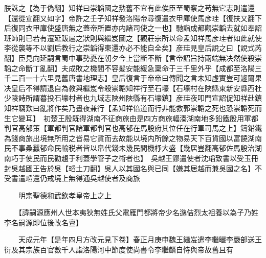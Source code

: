朕誅之【為于偽翻】知祥曰崇韜國之勲舊不宜有此俟臣至蜀察之苟無它志則遣還【還從宣翻又如字】帝許之壬子知祥發洛陽帝尋復遣衣甲庫使馬彦珪【復扶又翻下后復同衣甲庫使盛唐無之蓋帝所置亦内諸司使之一也】馳詣成都觀崇韜去就如奉詔班師則已若有遷延跋扈之狀則與繼岌圖之【觀莊宗所以命孟知祥馬彦珪者如此就使李從襲等不以劉后教行之崇韜得東還亦必不能自全矣】彦珪見皇后說之曰【說式芮翻】臣見向延嗣言蜀中事勢憂在朝夕今上當斷不斷【言帝詔旨持兩端無决然使殺崇韜之命斷丁亂翻】夫成敗之機間不容髪安能緩急稟命于三千里外乎【成都至洛陽三千二百一十六里見舊唐書地理志】皇后復言于帝帝曰傳聞之言未知虛實豈可遽爾果决皇后不得請退自為教與繼岌令殺崇韜知祥行至石壕【石壕村在陜縣東新安縣西杜少陵詩所謂暮投石壕村者也九域志陜州陜縣有石壕鎮】彦珪夜叩門宣詔促知祥赴鎮知祥竊歎曰亂將作矣乃晝夜兼行【孟知祥倍道而行非能救郭崇韜之死也恐崇韜死而生它變耳】　初楚王殷既得湖南不征商旅由是四方商旅輻湊湖南地多鉛鐵殷用軍都判官高郁策【軍都判官諸軍都判官也高郁在馬殷府其位任在行軍司馬之上】鑄鉛鐵為錢商旅出境無所用之皆易它貨而去故能以境内所餘之物易天下百貨國以富饒湖南民不事桑蠶郁命民輸税者皆以帛代錢未幾民間機杼大盛【幾居豈翻高郁佐馬殷治湖南巧于使民而民勸趨于利蓋學管子之術者也】　吳越王鏐遣使者沈瑫致書以受玉冊封吳越國王告於吳【瑫土刀翻】吳人以其國名與已同【嫌其居越而兼吳國之名】不受書遣瑫還仍戒境上無得通吳越使者及商旅

　　明宗聖德和武欽孝皇帝上之上

　　【諱嗣源應州人世本夷狄無姓氏父電雁門都將帝少名邈佶烈太祖養以為子乃姓李名嗣源即位後改名亶】

　　天成元年【是年四月方改元見下卷】春正月庚申魏王繼岌遣李繼曮李嚴部送王衍及其宗族百官數千人詣洛陽河中節度使尚書令李繼麟自恃與帝故舊且有

